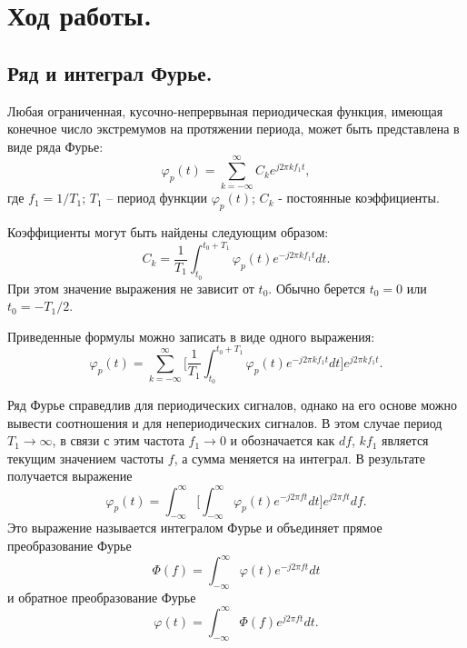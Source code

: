 \documentclass[a4paper,14pt]{extarticle}
\begin{document}
\section{Ход работы.}

\subsection{Ряд и интеграл Фурье.}

Любая ограниченная, кусочно-непрервыная периодическая функция, имеющая конечное число экстремумов на протяжении периода, может быть представлена в виде ряда Фурье: 
\begin{equation*}
\varphi_p (t) = \sum_{k = -\infty}^{\infty} C_k e^{j 2 \pi k f_1 t} ,
\label{f1}
\end{equation*}
где $f_1 = 1 / T_1$; $T_1$ -- период функции $\varphi_p (t)$; $C_k$ - постоянные коэффициенты.

Коэффициенты могут быть найдены следующим образом:
\begin{equation*}
C_k = \frac{1}{T_1} \int_{t_0}^{t_0 + T_1} \varphi_p (t) e^{-j 2 \pi k f_1 t} dt.
\label{f2}
\end{equation*}
При этом значение выражения не зависит от $t_0$. Обычно берется $t_0 = 0$ или $t_0 = - T_1 / 2$.

Приведенные формулы можно записать в виде одного выражения:  
\begin{equation*}
\varphi_p (t) = \sum_{k = -\infty}^{\infty} \bigg[ \frac{1}{T_1} \int_{t_0}^{t_0 + T_1} \varphi_p (t) e^{-j 2 \pi k f_1 t} dt \bigg] e^{j 2 \pi k f_1 t}.
\label{f3}
\end{equation*}


Ряд Фурье справедлив для периодических сигналов, однако на его основе можно вывести соотношения и для непериодических сигналов. В этом случае период $T_1 \rightarrow \infty$, в связи с этим частота $f_1 \rightarrow 0$ и обозначается как $df$, $k f_1$ является текущим значением частоты $f$, а сумма меняется на интеграл. В результате получается выражение 
\begin{equation*}
\varphi_p (t) = \int_{-\infty}^{\infty} \bigg[ \int_{-\infty}^{\infty} \varphi_p (t) e^{-j 2 \pi f t} dt \bigg] e^{j 2 \pi f t} df.
\label{f4}
\end{equation*}
Это выражение называется интегралом Фурье и объединяет прямое преобразование Фурье
\begin{equation*}
\Phi (f) = \int_{-\infty}^{\infty} \varphi (t) e^{-j 2 \pi f t} dt
\end{equation*}
и обратное преобразование Фурье
\begin{equation*}
\varphi (t) = \int_{-\infty}^{\infty} \Phi (f) e^{j 2 \pi f t} dt.
\end{equation*}
\end{document}
